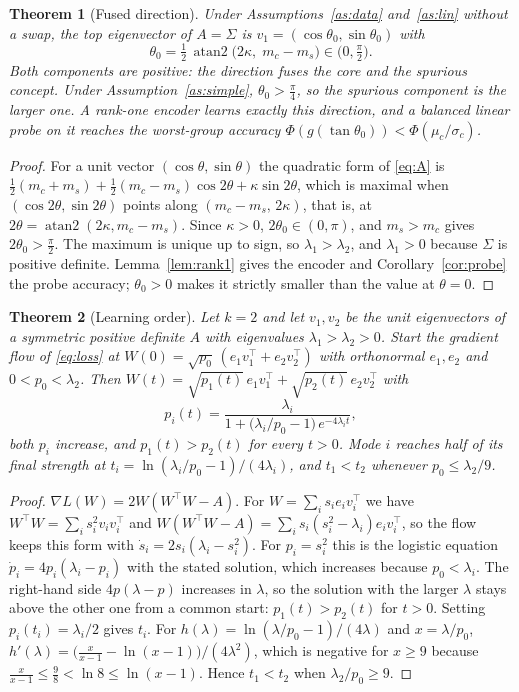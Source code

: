 \documentclass[11pt]{article}
\newtheorem{theorem}{Theorem}
\theoremstyle{definition}
\theoremstyle{remark}
\begin{document}
\begin{theorem}[Fused direction]\label{thm:fused}
Under Assumptions~\ref{as:data} and~\ref{as:lin} without a swap, the top eigenvector of $A=\Sigma$ is
$v_1=(\cos\theta_0,\sin\theta_0)$ with
\[
\theta_0=\tfrac12\,\operatorname{atan2}\big(2\kappa,\;m_c-m_s\big)\in\big(0,\tfrac\pi2\big).
\]
Both components are positive: the direction fuses the core and the spurious concept. Under
Assumption~\ref{as:simple}, $\theta_0>\tfrac\pi4$, so the spurious component is the larger one. A rank-one encoder
learns exactly this direction, and a balanced linear probe on it reaches the worst-group accuracy
$\Phi(g(\tan\theta_0))<\Phi(\mu_c/\sigma_c)$.
\end{theorem}

\begin{proof}
For a unit vector $(\cos\theta,\sin\theta)$ the quadratic form of \eqref{eq:A} is
$\tfrac12(m_c+m_s)+\tfrac12(m_c-m_s)\cos2\theta+\kappa\sin2\theta$, which is maximal when $(\cos2\theta,\sin2\theta)$
points along $(m_c-m_s,\,2\kappa)$, that is, at $2\theta=\operatorname{atan2}(2\kappa,m_c-m_s)$. Since $\kappa>0$,
$2\theta_0\in(0,\pi)$, and $m_s>m_c$ gives $2\theta_0>\tfrac\pi2$. The maximum is unique up to sign, so
$\lambda_1>\lambda_2$, and $\lambda_1>0$ because $\Sigma$ is positive definite. Lemma~\ref{lem:rank1} gives the
encoder and Corollary~\ref{cor:probe} the probe accuracy; $\theta_0>0$ makes it strictly smaller than the value at
$\theta=0$.
\end{proof}

\begin{theorem}[Learning order]\label{thm:order}
Let $k=2$ and let $v_1,v_2$ be the unit eigenvectors of a symmetric positive definite $A$ with eigenvalues
$\lambda_1>\lambda_2>0$. Start the gradient flow of \eqref{eq:loss} at $W(0)=\sqrt{p_0}\,(e_1v_1^\top+e_2v_2^\top)$
with orthonormal $e_1,e_2$ and $0<p_0<\lambda_2$. Then $W(t)=\sqrt{p_1(t)}\,e_1v_1^\top+\sqrt{p_2(t)}\,e_2v_2^\top$ with
\[
p_i(t)=\frac{\lambda_i}{1+\big(\lambda_i/p_0-1\big)\,e^{-4\lambda_it}},
\]
both $p_i$ increase, and $p_1(t)>p_2(t)$ for every $t>0$. Mode $i$ reaches half of its final strength at
$t_i=\ln(\lambda_i/p_0-1)/(4\lambda_i)$, and $t_1<t_2$ whenever $p_0\le\lambda_2/9$.
\end{theorem}

\begin{proof}
$\nabla L(W)=2W(W^\top W-A)$. For $W=\sum_is_ie_iv_i^\top$ we have $W^\top W=\sum_is_i^2v_iv_i^\top$ and
$W(W^\top W-A)=\sum_is_i(s_i^2-\lambda_i)e_iv_i^\top$, so the flow keeps this form with
$\dot s_i=2s_i(\lambda_i-s_i^2)$. For $p_i=s_i^2$ this is the logistic equation $\dot p_i=4p_i(\lambda_i-p_i)$ with
the stated solution, which increases because $p_0<\lambda_i$. The right-hand side $4p(\lambda-p)$ increases in
$\lambda$, so the solution with the larger $\lambda$ stays above the other one from a common start:
$p_1(t)>p_2(t)$ for $t>0$. Setting $p_i(t_i)=\lambda_i/2$ gives $t_i$. For $h(\lambda)=\ln(\lambda/p_0-1)/(4\lambda)$
and $x=\lambda/p_0$,
$h'(\lambda)=\big(\tfrac{x}{x-1}-\ln(x-1)\big)/(4\lambda^2)$, which is negative for $x\ge9$ because
$\tfrac{x}{x-1}\le\tfrac98<\ln8\le\ln(x-1)$. Hence $t_1<t_2$ when $\lambda_2/p_0\ge9$.
\end{proof}
\end{document}

